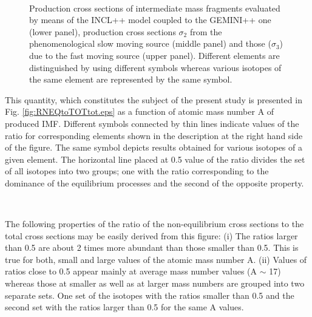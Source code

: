 \begin{figure}
  \centering
  \\
  \caption{Production cross sections of intermediate mass fragments evaluated by means of
  the INCL++ model coupled to the GEMINI++ one (lower panel),
  production cross sections $\sigma_2$ from the phenomenological slow moving source (middle panel) and those
  ($\sigma_3$) due to the fast moving source (upper panel).  Different elements are distinguished
  by using different symbols whereas  various isotopes
  of the same element are represented by the same symbol.}
  \label{fig:SGS2S3}
\end{figure}
%
This quantity, which constitutes the subject of the present study is
presented in Fig. \ref{fig:RNEQtoTOTtot.eps} as a function of atomic
mass number A of produced IMF. Different symbols connected by thin
lines indicate values of the ratio for corresponding elements shown
in the description at the right hand side of the figure. The same
symbol depicts  results obtained for various isotopes of a given
element. The horizontal line placed at 0.5 value of the ratio
divides  the set of all isotopes into two groups; one with  the
ratio corresponding to the dominance of the equilibrium processes
and the second of the opposite property.



%
%
\begin{figure*}
  \centering
  \\
  \caption{Atomic mass number A dependence of the ratio of non-equilibrium production
  cross section  to the total production cross section for intermediate mass fragments
  emerging from p+Ag collisions.
  }
  \label{fig:RNEQtoTOTtot.eps}
\end{figure*}
%





%
The following properties of the ratio of the non-equilib\-rium cross
 sections to the total cross sections may be easily
 derived from
 this figure: (i) The ratios larger than 0.5 are about 2 times more abundant
 than those smaller than 0.5.  This is true for both, small and large values
 of the atomic mass number A.
%
(ii) Values of  ratios close to 0.5 appear mainly at average
 mass number values (A $\sim$ 17) whereas those at smaller as well
 as at larger mass numbers are grouped into two separate sets.
 One set of the isotopes with the ratios smaller than 0.5
 and the second set with the ratios larger than 0.5 for the same A values.

